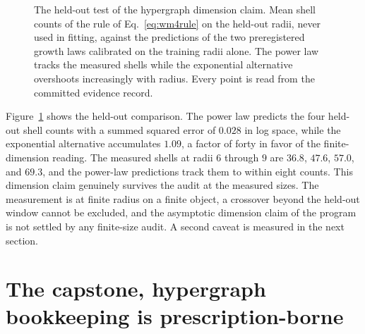 \documentclass[aps,pre,reprint,nofootinbib]{revtex4-2}
\begin{document}
\begin{figure}[t]
\centering
{}
\caption{The held-out test of the hypergraph dimension claim.  Mean
shell counts of the rule of Eq.~\eqref{eq:wm4rule} on the held-out
radii, never used in fitting, against the predictions of the two
preregistered growth laws calibrated on the training radii alone.  The
power law tracks the measured shells while the exponential alternative
overshoots increasingly with radius.  Every point is read from the
committed evidence record.}
\label{fig:wm4}
\end{figure}

Figure~\ref{fig:wm4} shows the held-out comparison.  The power law
predicts the four held-out shell counts with a summed squared error of
$0.028$ in log space, while the exponential alternative accumulates
$1.09$, a factor of forty in favor of the finite-dimension reading.
The measured shells at radii $6$ through $9$ are $36.8$, $47.6$,
$57.0$, and $69.3$, and the power-law predictions track them to
within eight counts.  This dimension claim genuinely survives the audit at
the measured sizes.  The
measurement is at finite radius on a finite object, a crossover
beyond the held-out window cannot be excluded, and the asymptotic
dimension claim of the program is not settled by any finite-size
audit.  A second caveat is measured in the next
section.

\section{The capstone, hypergraph bookkeeping is prescription-borne}
\label{sec:wm2h}
\end{document}

